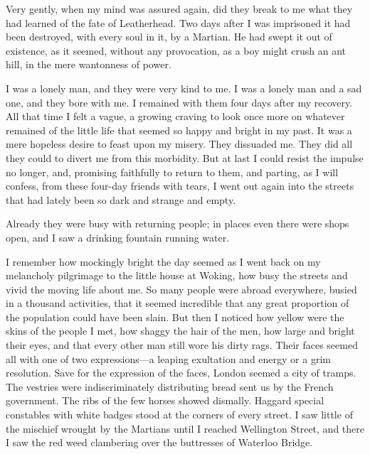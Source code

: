 Very gently, when my mind was assured again, did they break to me what they had learned of the fate of Leatherhead. Two days after I was imprisoned it had been destroyed, with every soul in it, by a Martian. He had swept it out of existence, as it seemed, without any provocation, as a boy might crush an ant hill, in the mere wantonness of power.

I was a lonely man, and they were very kind to me. I was a lonely man and a sad one, and they bore with me. I remained with them four days after my recovery. All that time I felt a vague, a growing craving to look once more on whatever remained of the little life that seemed so happy and bright in my past. It was a mere hopeless desire to feast upon my misery. They dissuaded me. They did all they could to divert me from this morbidity. But at last I could resist the impulse no longer, and, promising faithfully to return to them, and parting, as I will confess, from these four-day friends with tears, I went out again into the streets that had lately been so dark and strange and empty.

Already they were busy with returning people; in places even there were shops open, and I saw a drinking fountain running water.

I remember how mockingly bright the day seemed as I went back on my melancholy pilgrimage to the little house at Woking, how busy the streets and vivid the moving life about me. So many people were abroad everywhere, busied in a thousand activities, that it seemed incredible that any great proportion of the population could have been slain. But then I noticed how yellow were the skins of the people I met, how shaggy the hair of the men, how large and bright their eyes, and that every other man still wore his dirty rags. Their faces seemed all with one of two expressions—a leaping exultation and energy or a grim resolution. Save for the expression of the faces, London seemed a city of tramps. The vestries were indiscriminately distributing bread sent us by the French government. The ribs of the few horses showed dismally. Haggard special constables with white badges stood at the corners of every street. I saw little of the mischief wrought by the Martians until I reached Wellington Street, and there I saw the red weed clambering over the buttresses of Waterloo Bridge.

